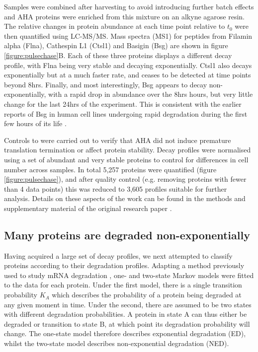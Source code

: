 \documentclass[a4paper,11pt,twoside,openright]{scrbook}
\begin{document}
Samples were combined after harvesting to avoid introducing further batch effects and AHA proteins were enriched from this mixture on an alkyne agarose resin. The relative changes in protein abundance at each time point relative to $t_{0}$ were then quantified using LC-MS/MS. Mass spectra (MS1) for peptides from Filamin  alpha (Flna), Cathespin L1 (Ctsl1) and Basigin (Bsg) are shown in figure \ref{figure:pulsechase}B. Each of these three proteins displays a different decay profile, with Flna being very stable and decaying exponentially. Ctsl1 also decays exponentially but at a much faster rate, and ceases to be detected at time points beyond 8hrs. Finally, and most interestingly, Bsg appears to decay non-exponentially, with a rapid drop in abundance over the 8hrs hours, but very little change for the last 24hrs of the experiment. This is consistent with the earlier reports of Bsg in human cell lines undergoing rapid degradation during the first few hours of its life \cite{Tyler2012}.

Controls to were carried out to verify that AHA did not induce premature translation termination or affect protein stability. Decay profiles were normalised using a set of abundant and very stable proteins to control for differences in cell number across samples. In total 5,257 proteins were quantified (figure \ref{figure:pulsechase}), and after quality control (e.g. removing proteins with fewer than 4 data points) this was reduced to 3,605 profiles suitable for further analysis. Details on these aspects of the work can be found in the methods and supplementary material of the original research paper \cite{McShane2016}.

\subsection{Many proteins are degraded non-exponentially}
Having acquired a large set of decay profiles, we next attempted to classify proteins according to their degradation profiles. Adapting a method previously used to study mRNA degradation \cite{Deneke2013}, one- and two-state Markov models were fitted to the data for each protein. Under the first model, there is a single transition probability $K_{A}$ which describes the probability of a protein being degraded at any given moment in time. Under the second, there are assumed to be two states with different degradation probabilities. A protein in state A can thus either be degraded or transition to state B, at which point its degradation probability will change. The one-state model therefore describes exponential degradation (ED), whilst the two-state model describes non-exponential degradation (NED).
\end{document}

